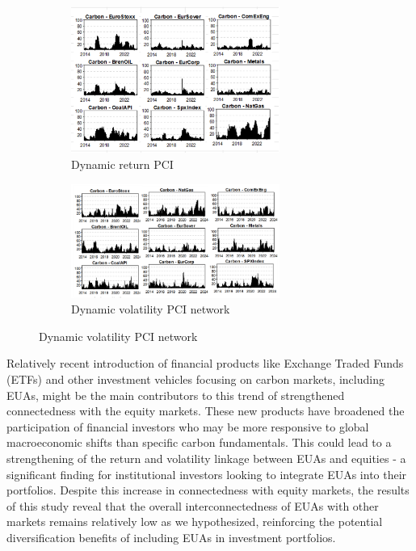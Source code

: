 \documentclass[preprint, 3p,
authoryear]{elsarticle} %
\begin{document}
\begin{figure}[H]
  \caption{Dynamic Return and Volatility Pairwise Connectedness Index (PCI) (Jan 2013 – Aug 2024)}
  \label{fig:dynPCI}
      \begin{subfigure}[b]{\textwidth}
        \centering
        \caption{Dynamic return PCI}
        \label{fig:dynretPCI}
        \includegraphics[width = 0.75\textwidth]{../figures/5a-DynRetPCI}
      \end{subfigure}
      \begin{subfigure}[b]{\textwidth}
        \centering
        \bigskip
        \caption{Dynamic volatility PCI network}
        \label{fig:dynvolPCI}
        \includegraphics[width = 0.75\textwidth]{../figures/5b-DynVolPCI}
      \end{subfigure}
\end{figure}

Relatively recent introduction of financial products like Exchange
Traded Funds (ETFs) and other investment vehicles focusing on carbon
markets, including EUAs, might be the main contributors to this trend of
strengthened connectedness with the equity markets. These new products
have broadened the participation of financial investors who may be more
responsive to global macroeconomic shifts than specific carbon
fundamentals. This could lead to a strengthening of the return and
volatility linkage between EUAs and equities - a significant finding for
institutional investors looking to integrate EUAs into their portfolios.
Despite this increase in connectedness with equity markets, the results
of this study reveal that the overall interconnectedness of EUAs with
other markets remains relatively low as we hypothesized, reinforcing the
potential diversification benefits of including EUAs in investment
portfolios.
\end{document}
